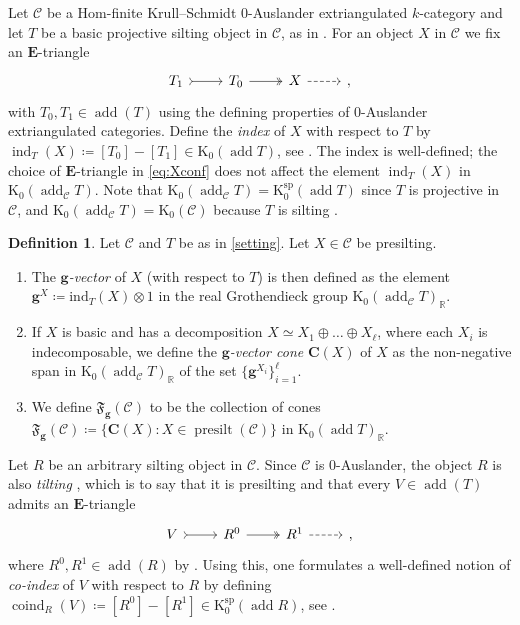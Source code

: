 \documentclass[10pt,twoside, a4paper,reqno]{amsart}
\DeclareMathOperator{\presilt}{presilt}
\DeclareMathOperator{\add}{add}
\DeclareMathOperator{\ind}{ind}
\DeclareMathOperator{\coind}{coind}
\newcommand{\partfan}[1]{\mathfrak{F}_{\bfg}(#1)}
\newcommand{\R}{\mathbb{R}}
\newcommand{\calC}{\mathcal{C}}
\newcommand{\E}{\mathbf{E}}
\newcommand{\boldC}{\mathbf{C}}
\newcommand{\K}{\mathrm{K}}
\newcommand{\Ksp}{\mathrm{K}^{\mathrm{sp}}}
\newcommand{\bfg}{\mathbf{g}}
\theoremstyle{definition}
\newtheorem{definition}[theorem]{Definition}
\begin{document}
Let $\calC$ be a Hom-finite Krull--Schmidt 0-Auslander extriangulated $k$-category and let $T$ be a basic projective silting object in $\calC$, as in . For an object $X$ in $\calC$ we fix {an $\E$-triangle}
\begin{equation}\label{eq:Xconf}
        \begin{tikzcd}
            T_1 \arrow[r, tail] & T_0 \arrow[r,two heads] & X \arrow[r, dashed] & {},
        \end{tikzcd}
\end{equation}
with $T_0,T_1\in\add(T)$ using the defining properties of 0-Auslander extriangulated categories. Define the \textit{index} of $X$ with respect to $T$ by $\ind_T(X) \coloneqq [T_0]-[T_1] \in \K_0(\add{T})$, see \cite[§4.3]{GNP23}. The index is well-defined; the choice of $\E$-triangle in \eqref{eq:Xconf} does not affect the element $\ind_T(X)$ in $\K_0(\add_{{\calC}}{T})$. Note that $\K_0(\add_{\calC}{T})=\Ksp_0(\add{T})$ since $T$ is projective in $\calC$, {and ${\K}_0(\add_{{\calC}} T) = \K_0(\calC)$ because $T$ is silting \cite[Thm. 4.1]{AT23}}.

\begin{definition}\label{def:gfan}
{Let $\calC$ and $T$ be as in \cref{setting}. Let $X \in \calC$ be presilting.}
    \begin{enumerate}
        \item The \textit{$\bfg$-vector} of $X$ (with respect to $T$) is then defined as the element $\bfg^X \coloneqq \mathrm{ind}_T(X) \otimes 1$ in the real Grothendieck group $ \K_0(\add_{{\calC}}{T})_{\R}$. 
        \item If $X$ is basic and has a decomposition $X \simeq X_1 \oplus \dots \oplus X_\ell$, where each $X_i$ is indecomposable, we define the \textit{$\bfg$-vector cone} $\boldC(X)$ of $X$ as the non-negative span in $\K_0(\add_{\calC}{T})_{\R}$ of the set $\{\bfg^{X_i}\}_{i=1}^{\ell}$.
        \item We define $\partfan{\calC}$ to be the collection of cones 
    $\partfan{\calC} \coloneqq \{ \boldC(X) : X \in \presilt(\calC)\} $
    in ${\K}_0(\add T)_\R$.
    \end{enumerate}
\end{definition}

Let $R$ be an arbitrary silting object in $\calC$. Since $\calC$ is 0-Auslander, the object $R$ is also \textit{tilting} \cite[{Thm.} 4.3]{GNP23}, which is to say that it is presilting and that every $V\in\add(T)$ admits {an $\E$-triangle}
\begin{equation*}
        \begin{tikzcd}
            V \arrow[r,tail] & R^0 \arrow[r,two heads] & R^1 \arrow[r, dashed] & {},
        \end{tikzcd}
\end{equation*}
where $R^0,R^1\in \add(R)$ {by} \cite[{Thm.} 4.3]{GNP23}. {Using this}, one formulates a well-defined notion of \textit{co-index} of $V$ with respect to $R$ by defining $\coind_R(V) \coloneqq [R^0]-[R^1]\in \Ksp_0(\add{R})${, see} \cite[§4.3]{GNP23} \cite[Lem. 4.36]{PPPP23}.
\end{document}
